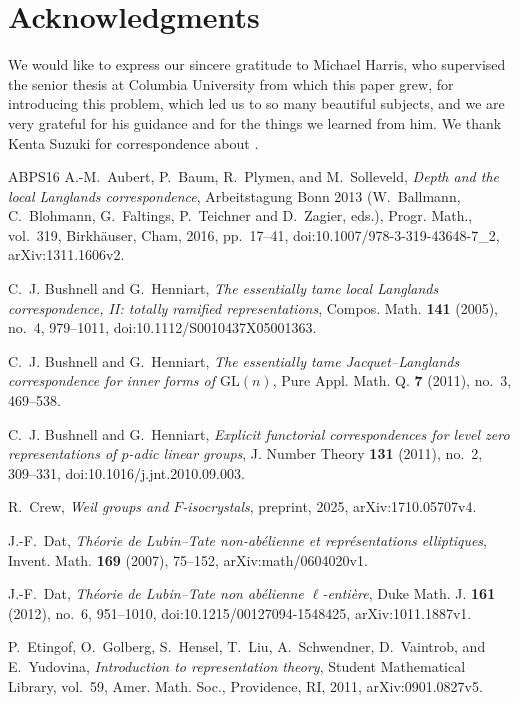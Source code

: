 \documentclass[a4paper,11pt]{amsart}
\theoremstyle{definition}
\theoremstyle{remark}
\numberwithin{equation}{section}
\begin{document}
\section*{Acknowledgments}

We would like to express our sincere gratitude to Michael Harris, who supervised the senior thesis at Columbia University from which this paper grew, for introducing this problem, which led us to so many beautiful subjects, and we are very grateful for his guidance and for the things we learned from him. We thank Kenta Suzuki for correspondence about \cite[Theorem~4.0.5]{Su23}.

\begin{thebibliography}{ABPS16}
A.-M.~Aubert, P.~Baum, R.~Plymen, and M.~Solleveld, \emph{Depth and the local Langlands correspondence}, Arbeitstagung Bonn 2013 (W.~Ballmann, C.~Blohmann, G.~Faltings, P.~Teichner and D.~Zagier, eds.), Progr. Math., vol.~319, Birkh\"auser, Cham, 2016, pp.~17--41, doi:10.1007/978-3-319-43648-7\_2, arXiv:1311.1606v2.

C.~J. Bushnell and G.~Henniart, \emph{The essentially tame local Langlands correspondence, {II}: totally ramified representations}, Compos. Math. \textbf{141} (2005), no.~4, 979--1011, doi:10.1112/S0010437X05001363.

C.~J. Bushnell and G.~Henniart, \emph{The essentially tame {J}acquet--{L}anglands correspondence for inner forms of $\mathrm{GL}(n)$}, Pure Appl. Math. Q. \textbf{7} (2011), no.~3, 469--538.

C.~J. Bushnell and G.~Henniart, \emph{Explicit functorial correspondences for level zero representations of $p$-adic linear groups}, J. Number Theory \textbf{131} (2011), no.~2, 309--331, doi:10.1016/j.jnt.2010.09.003.

R.~Crew, \emph{Weil groups and $F$-isocrystals}, preprint, 2025, arXiv:1710.05707v4.

J.-F.~Dat, \emph{Th\'eorie de Lubin--Tate non-ab\'elienne et repr\'esentations elliptiques}, Invent. Math. \textbf{169} (2007), 75--152, arXiv:math/0604020v1.

J.-F.~Dat, \emph{Th\'eorie de Lubin--Tate non ab\'elienne $\ell$-enti\`ere}, Duke Math. J. \textbf{161} (2012), no.~6, 951--1010, doi:10.1215/00127094-1548425, arXiv:1011.1887v1.

P.~Etingof, O.~Golberg, S.~Hensel, T.~Liu, A.~Schwendner, D.~Vaintrob, and E.~Yudovina, \emph{Introduction to representation theory}, Student Mathematical Library, vol.~59, Amer. Math. Soc., Providence, RI, 2011, arXiv:0901.0827v5.


\end{thebibliography}
\end{document}
